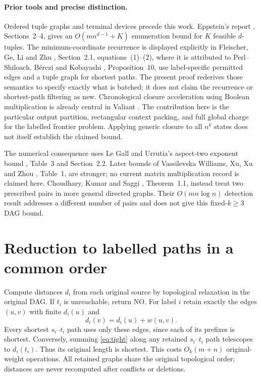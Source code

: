 \documentclass[acmlarge,11pt,screen,nonacm]{acmart}
\begin{document}
\paragraph{Prior tools and precise distinction.}
Ordered tuple graphs and terminal devices precede this work. Eppstein's
report \cite{Epp95}, Sections~2--4, gives an
$O(mn^{d-1}+K)$ enumeration bound for $K$ feasible $d$-tuples. The
minimum-coordinate recurrence is displayed explicitly in Fleischer, Ge, Li
and Zhu \cite{FGLZ07}, Section~2.1, equations~(1)--(2), where it is attributed
to Perl--Shiloach. B\'erczi and Kobayashi \cite{BK17}, Proposition~10,
use label-specific permitted edges and a tuple graph for shortest paths.
The present proof rederives those semantics to specify exactly what is batched;
it does not claim the recurrence or shortest-path filtering as new.
Chronological closure acceleration using Boolean multiplication is already
central in Valiant \cite{Val75}. The contribution here is the particular
output partition, rectangular context packing, and full global charge for
the labelled frontier problem. Applying generic closure to all $n^k$ states
does not itself establish the claimed bound.

The numerical consequence uses Le Gall and Urrutia's aspect-two exponent
bound \cite{LGU18}, Table~3 and Section~2.2. Later bounds of Vassilevska
Williams, Xu, Xu and Zhou \cite{WXXZ24}, Table~1, are stronger; no current
matrix multiplication record is claimed here. Choudhary, Kumar and Saggi
\cite{CKS26}, Theorem~1.1, instead treat two prescribed pairs in more general
directed graphs. Their $O(mn\log n)$ detection result addresses a different
number of pairs and does not give this fixed-$k\geq3$ DAG bound.

\section{Reduction to labelled paths in a common order}\label{sec:reduction}
Compute distances $d_i$ from each original source by topological relaxation
in the original DAG. If $t_i$ is unreachable, return NO. For label $i$ retain
exactly the edges $(u,v)$ with finite $d_i(u)$ and
\begin{equation}\label{eq:tight}
 d_i(v)=d_i(u)+w(u,v).
\end{equation}
Every shortest $s_i$--$t_i$ path uses only these edges, since each of its
prefixes is shortest. Conversely, summing \eqref{eq:tight} along any retained
$s_i$--$t_i$ path telescopes to $d_i(t_i)$. Thus its original length is
shortest. This costs $O_k(m+n)$ original-weight operations. All retained
graphs share the original topological order; distances are never recomputed
after conflicts or deletions.
\end{document}
